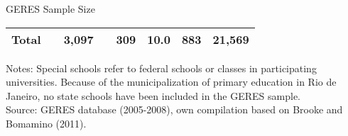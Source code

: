 \documentclass{beamer}
\begin{document}
\begin{frame}[label=GERESSample]{GERES Sample Size}
\begin{table}[H]
\begin{adjustbox}{max width=\textwidth}
\begin{tabular}{llllllll}
    \midrule
    \textbf{Total} &       & \multicolumn{1}{c}{\textbf{3,097}} &       & \multicolumn{1}{c}{\textbf{309}} & \multicolumn{1}{c}{\textbf{10.0}} & \multicolumn{1}{c}{\textbf{883}} & \multicolumn{1}{c}{\textbf{21,569}} \vspace{-3pt} \\
    \bottomrule
   \end{tabular}%
  \end{adjustbox}
    \begin{minipage}{1\textwidth} 
{\tiny
Notes: Special schools refer to federal schools or classes in participating universities. Because of the municipalization of primary education in Rio de Janeiro, no state schools have been included in the GERES sample. \\ Source: GERES database (2005-2008), own compilation based on Brooke and Bomamino (2011). \par} 
\end{minipage}
\vspace{10pt}  
\end{table}%
\end{frame}
\end{document}
